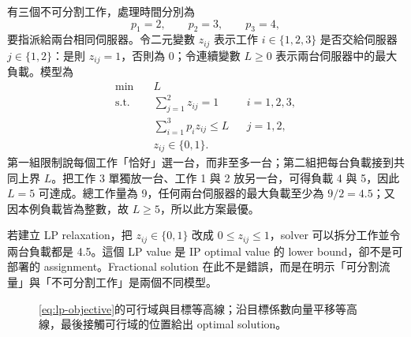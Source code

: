 \documentclass[11pt,a4paper,oneside,openany]{book}
\begin{document}
\begin{example}[從伺服器指派語句建立 0--1 IP]
有三個不可分割工作，處理時間分別為
\[
 p_1=2,\qquad p_2=3,\qquad p_3=4,
\]
要指派給兩台相同伺服器。令二元變數 $z_{ij}$ 表示工作 $i\in\{1,2,3\}$ 是否交給伺服器 $j\in\{1,2\}$：是則 $z_{ij}=1$，否則為 0；令連續變數 $L\ge0$ 表示兩台伺服器中的最大負載。模型為
\begin{align}
\min\quad &L \label{eq:makespan-ip}\\
\text{s.t.}\quad
&\sum_{j=1}^{2}z_{ij}=1 && i=1,2,3,\nonumber\\
&\sum_{i=1}^{3}p_i z_{ij}\le L && j=1,2,\nonumber\\
&z_{ij}\in\{0,1\}. &&\nonumber
\end{align}
第一組限制說每個工作「恰好」選一台，而非至多一台；第二組把每台負載接到共同上界 $L$。把工作 3 單獨放一台、工作 1 與 2 放另一台，可得負載 4 與 5，因此 $L=5$ 可達成。總工作量為 9，任何兩台伺服器的最大負載至少為 $9/2=4.5$；又因本例負載皆為整數，故 $L\ge5$，所以此方案最優。

若建立 LP relaxation，把 $z_{ij}\in\{0,1\}$ 改成 $0\le z_{ij}\le1$，solver 可以拆分工作並令兩台負載都是 4.5。這個 LP value 是 IP optimal value 的 lower bound，卻不是可部署的 assignment。Fractional solution 在此不是錯誤，而是在明示「可分割流量」與「不可分割工作」是兩個不同模型。
\end{example}

\begin{figure}[htbp]
\centering
{}
\caption{\cref{eq:lp-objective}的可行域與目標等高線；沿目標係數向量平移等高線，最後接觸可行域的位置給出 optimal solution。}
\label{fig:feasible-region}
\end{figure}
\end{document}
